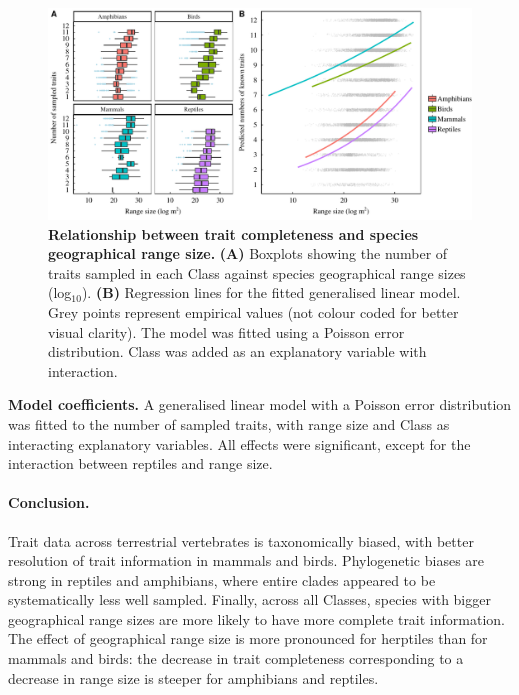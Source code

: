 \begin{figure}[h!]
\centering
\includegraphics[scale=0.7]{figures/chapter2/NA_spatial_patterns/Poisson_model_predictions}
\caption[Relationship between trait completeness and species geographical range size]{\textbf{Relationship between trait completeness and species geographical range size.} \textbf{(A)} Boxplots showing the number of traits sampled in each Class against species geographical range sizes (log$_{10}$). \textbf{(B)} Regression lines for the fitted generalised linear model. Grey points represent empirical values (not colour coded for better visual clarity). The model was fitted using a Poisson error distribution. Class was added as an explanatory variable with interaction.}
\label{poisson}
\end{figure}

\begin{table}[h!]
\renewcommand{\baselinestretch}{1}
\renewcommand{\arraystretch}{1.2}
\begin{center}\fontsize{9}{11}\selectfont
\caption[Model coefficients]{\textbf{Model coefficients.} A generalised linear model with a Poisson error distribution was fitted to the number of sampled traits, with range size and Class as interacting explanatory variables. All effects were significant, except for the interaction between reptiles and range size.}
\end{center}
\label{Poisson_model_coef}
\end{table}

\paragraph{Conclusion.} Trait data across terrestrial vertebrates is taxonomically biased, with better resolution of trait information in mammals and birds. Phylogenetic biases are strong in reptiles and amphibians, where entire clades appeared to be systematically less well sampled. Finally, across all Classes, species with bigger geographical range sizes are more likely to have more complete trait information. The effect of geographical range size is more pronounced for herptiles than for mammals and birds: the decrease in trait completeness corresponding to a decrease in range size is steeper for amphibians and reptiles.

